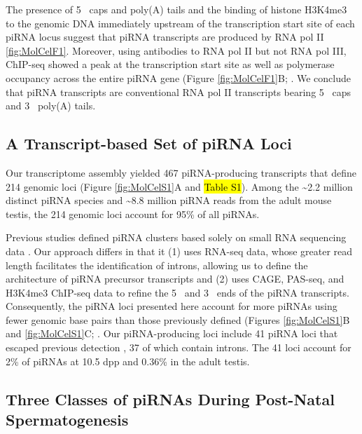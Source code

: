     The presence of 5\textprime~ caps and poly(A) tails and the binding of histone H3K4me3 to the genomic DNA immediately upstream of the transcription start site of each piRNA locus suggest that piRNA transcripts are produced by RNA pol II \ref{fig:MolCelF1}. Moreover, using antibodies to RNA pol II but not RNA pol III, ChIP-seq showed a peak at the transcription start site as well as polymerase occupancy across the entire piRNA gene (Figure \ref{fig:MolCelF1}B; \citep{Kutter2011}. We conclude that piRNA transcripts are conventional RNA pol II transcripts bearing 5\textprime~ caps and 3\textprime~ poly(A) tails.

  \subsection{A Transcript-based Set of piRNA Loci}

    Our transcriptome assembly yielded 467 piRNA-producing transcripts that define 214 genomic loci (Figure \ref{fig:MolCelS1}A and \hl{Table S1}). Among the \textasciitilde2.2 million distinct piRNA species and \textasciitilde8.8 million piRNA reads from the adult mouse testis, the 214 genomic loci account for 95\% of all piRNAs.

    Previous studies defined piRNA clusters based solely on small RNA sequencing data \citep{Girard2006, Lau2006, Aravin2007a}. Our approach differs in that it (1) uses RNA-seq data, whose greater read length facilitates the identification of introns, allowing us to define the architecture of piRNA precursor transcripts and (2) uses CAGE, PAS-seq, and H3K4me3 ChIP-seq data to refine the 5\textprime~ and 3\textprime~ ends of the piRNA transcripts. Consequently, the piRNA loci presented here account for more piRNAs using fewer genomic base pairs than those previously defined (Figures \ref{fig:MolCelS1}B and \ref{fig:MolCelS1}C; \citep{Lau2006, Girard2006}. Our piRNA-producing loci include 41 piRNA loci that escaped previous detection \citep{Girard2006, Lau2006, Aravin2007a}, 37 of which contain introns. The 41 loci account for 2\% of piRNAs at 10.5 dpp and 0.36\% in the adult testis.

  \subsection{Three Classes of piRNAs During Post-Natal Spermatogenesis}

